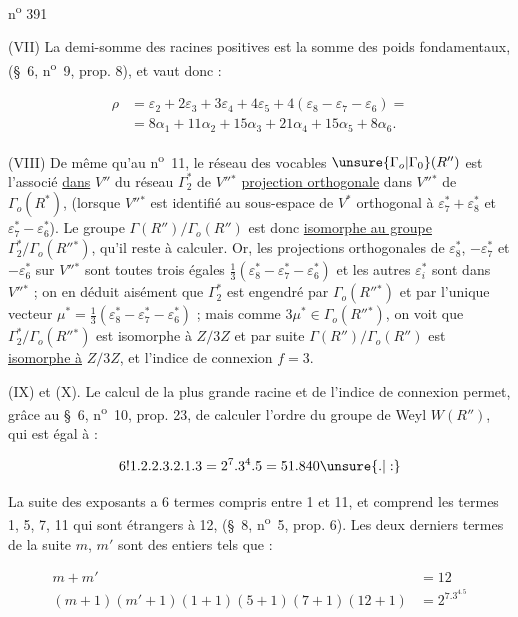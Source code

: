 \hfill n\textsuperscript{o} 391

(VII) La demi-somme des racines positives est la somme des poids fondamentaux, (\S~6, n\textsuperscript{o}~9, prop. 8), et vaut donc :

\[
\begin{aligned}
\rho&=\varepsilon_2+2\varepsilon_3+3\varepsilon_4+4\varepsilon_5+4(\varepsilon_8-\varepsilon_7-\varepsilon_6)=\\
&=8\alpha_1+11\alpha_2+15\alpha_3+21\alpha_4+15\alpha_5+8\alpha_6.
\end{aligned}
\]

(VIII) De même qu'au n\textsuperscript{o}~11, le réseau des vocables $\unsure{\Gamma_o|\Gamma_0}(R'')$ est l'associé \uline{dans} $V''$ du réseau $\Gamma_2^*$ de $V''{}^*$ \uline{projection orthogonale} dans $V''{}^*$ de $\Gamma_o(R^*)$, (lorsque $V''{}^*$ est identifié au sous-espace de $V^*$ orthogonal à $\varepsilon_7^*+\varepsilon_8^*$ et $\varepsilon_7^*-\varepsilon_6^*$). Le groupe $\Gamma(R'')/\Gamma_o(R'')$ est donc \uline{isomorphe au groupe} $\Gamma_2^*/\Gamma_o(R''{}^*)$, qu'il reste à calculer. Or, les projections orthogonales de $\varepsilon_8^*$, $-\varepsilon_7^*$ et $-\varepsilon_6^*$ sur $V''{}^*$ sont toutes trois égales $\frac{1}{3}(\varepsilon_8^*-\varepsilon_7^*-\varepsilon_6^*)$ et les autres $\varepsilon_i^*$ sont dans $V''{}^*$ ; on en déduit aisément que $\Gamma_2^*$ est engendré par $\Gamma_o(R''{}^*)$ et par l'unique vecteur $\mu^*=\frac{1}{3}(\varepsilon_8^*-\varepsilon_7^*-\varepsilon_6^*)$ ; mais comme $3\mu^*\in\Gamma_o(R''{}^*)$, on voit que $\Gamma_2^*/\Gamma_o(R''{}^*)$ est isomorphe à $Z/3Z$ et par suite $\Gamma(R'')/\Gamma_o(R'')$ est \uline{isomorphe à} $Z/3Z$, et l'indice de connexion $f=3$.

(IX) et (X). Le calcul de la plus grande racine et de l'indice de connexion permet, grâce au \S~6, n\textsuperscript{o}~10, prop. 23, de calculer l'ordre du groupe de Weyl $W(R'')$, qui est égal à :

\[
6!1.2.2.3.2.1.3=2^7.3^4.5=51.840\unsure{.|:}
\]

La suite des exposants a 6 termes compris entre 1 et 11, et comprend les termes 1, 5, 7, 11 qui sont étrangers à 12, (\S~8, n\textsuperscript{o}~5, prop. 6). Les deux derniers termes de la suite $m$, $m'$ sont des entiers tels que :

\[
\begin{aligned}
m+m'&=12\\
(m+1)(m'+1)(1+1)(5+1)(7+1)(12+1)&=2^7.3^4.5
\end{aligned}
\]

